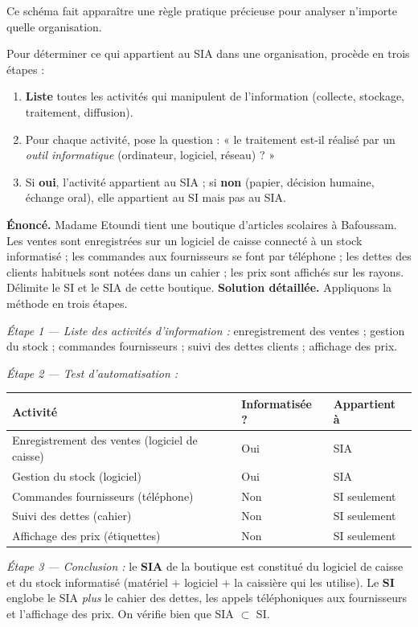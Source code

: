\documentclass[11pt]{article}
\begin{document}
Ce schéma fait apparaître une règle pratique précieuse pour analyser n'importe quelle organisation.

\begin{methode}
Pour déterminer ce qui appartient au SIA dans une organisation, procède en trois étapes :
\begin{enumerate}
  \item \textbf{Liste} toutes les activités qui manipulent de l'information (collecte, stockage, traitement, diffusion).
  \item Pour chaque activité, pose la question : « le traitement est-il réalisé par un \emph{outil informatique} (ordinateur, logiciel, réseau) ? »
  \item Si \textbf{oui}, l'activité appartient au SIA ; si \textbf{non} (papier, décision humaine, échange oral), elle appartient au SI mais pas au SIA.
\end{enumerate}
\end{methode}

\begin{exoresolu}
\textbf{Énoncé.} Madame Etoundi tient une boutique d'articles scolaires à Bafoussam. Les ventes sont enregistrées sur un logiciel de caisse connecté à un stock informatisé ; les commandes aux fournisseurs se font par téléphone ; les dettes des clients habituels sont notées dans un cahier ; les prix sont affichés sur les rayons. Délimite le SI et le SIA de cette boutique.
\tcblower
\textbf{Solution détaillée.} Appliquons la méthode en trois étapes.

\emph{Étape 1 — Liste des activités d'information :} enregistrement des ventes ; gestion du stock ; commandes fournisseurs ; suivi des dettes clients ; affichage des prix.

\emph{Étape 2 — Test d'automatisation :}
\begin{center}
\begin{tabularx}{\linewidth}{|X|l|l|}
\hline
\rowcolor{popblueL} \textbf{Activité} & \textbf{Informatisée ?} & \textbf{Appartient à} \\
\hline
Enregistrement des ventes (logiciel de caisse) & Oui & SIA \\
\hline
Gestion du stock (logiciel) & Oui & SIA \\
\hline
Commandes fournisseurs (téléphone) & Non & SI seulement \\
\hline
Suivi des dettes (cahier) & Non & SI seulement \\
\hline
Affichage des prix (étiquettes) & Non & SI seulement \\
\hline
\end{tabularx}
\end{center}

\emph{Étape 3 — Conclusion :} le \textbf{SIA} de la boutique est constitué du logiciel de caisse et du stock informatisé (matériel $+$ logiciel $+$ la caissière qui les utilise). Le \textbf{SI} englobe le SIA \emph{plus} le cahier des dettes, les appels téléphoniques aux fournisseurs et l'affichage des prix. On vérifie bien que SIA $\subset$ SI.
\end{exoresolu}
\end{document}
